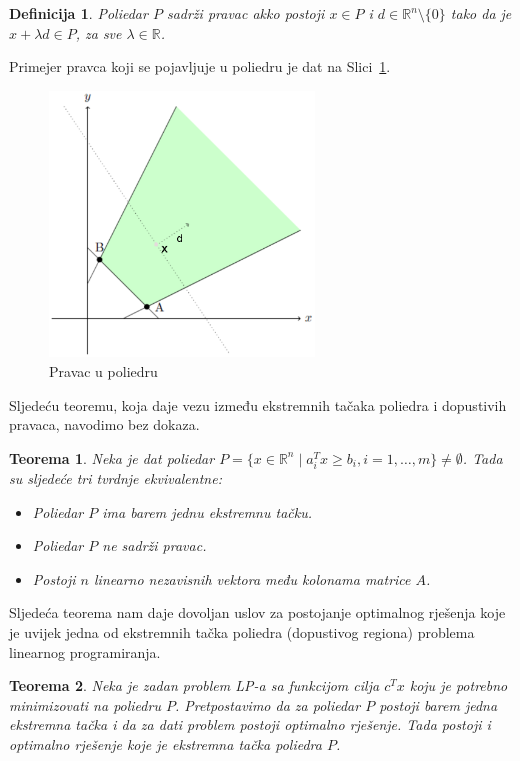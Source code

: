 \documentclass[a4paper, utf8, 11pt, colorlinks]{book}
\newtheorem{definition}{Definicija}[chapter]
\newtheorem{thm}{Teorema}[chapter]
\theoremstyle{definition}
\begin{document}
 \begin{definition}
       Poliedar $P$ sadrži pravac akko postoji $x \in P$ i $d \in \mathbb{R}^n \setminus \{0\}$ tako da je $x + \lambda d \in P$, za sve $\lambda \in \mathbb{R}$. 
 \end{definition}
Primejer pravca koji se pojavljuje u poliedru je dat na Slici~\ref{fig:extreme-ray}. 
\begin{figure}[!htb]
	\centering
	\includegraphics[width=200pt,height=200pt]{extremerays.eps}
	\caption{Pravac u poliedru}
		\label{fig:extreme-ray}
\end{figure}

Sljedeću teoremu, koja daje vezu između ekstremnih tačaka poliedra i dopustivih pravaca, navodimo bez dokaza.

\begin{thm}\label{thm:pravac}
   Neka je dat poliedar $P=\{ x \in \mathbb{R}^n  \mid a_i^T x \geq b_i, i=1,\ldots,m\} \neq \emptyset$. Tada su sljedeće tri tvrdnje ekvivalentne:
   \begin{itemize}
       \item  Poliedar $P$ ima barem jednu ekstremnu tačku.
       \item Poliedar $P$ ne sadrži pravac.
       \item Postoji $n$ linearno nezavisnih vektora  među kolonama matrice $A$. %
   \end{itemize}
\end{thm}

Sljedeća teorema nam daje dovoljan uslov za postojanje optimalnog rješenja koje je uvijek jedna od ekstremnih tačka poliedra (dopustivog regiona) problema linearnog programiranja.

\begin{thm}
   Neka je zadan problem LP-a sa funkcijom cilja $c^Tx$ koju je potrebno minimizovati na poliedru $P$. Pretpostavimo da za poliedar $P$ postoji barem jedna ekstremna tačka i da za dati problem postoji optimalno rješenje. Tada postoji i optimalno rješenje koje je ekstremna tačka poliedra $P$.
\end{thm}
\end{document}
